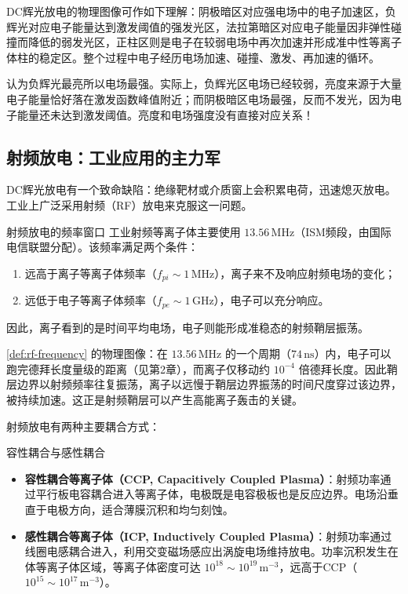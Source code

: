 \documentclass[12pt,a4paper,openany,oneside]{book}
\begin{document}
\begin{insight}{}{}
DC辉光放电的物理图像可作如下理解：阴极暗区对应强电场中的电子加速区，负辉光对应电子能量达到激发阈值的强发光区，法拉第暗区对应电子能量因非弹性碰撞而降低的弱发光区，正柱区则是电子在较弱电场中再次加速并形成准中性等离子体柱的稳定区。整个过程中电子经历电场加速、碰撞、激发、再加速的循环。
\end{insight}

\begin{warning}{}{}
认为负辉光最亮所以电场最强。实际上，负辉光区电场已经较弱，亮度来源于大量电子能量恰好落在激发函数峰值附近；而阴极暗区电场最强，反而不发光，因为电子能量还未达到激发阈值。亮度和电场强度没有直接对应关系！
\end{warning}

\subsection{射频放电：工业应用的主力军}

DC辉光放电有一个致命缺陷：绝缘靶材或介质窗上会积累电荷，迅速熄灭放电。工业上广泛采用射频（RF）放电来克服这一问题。

\begin{definition}{射频放电的频率窗口}{}{}
\label{def:rf-frequency}
工业射频等离子体主要使用 $13.56\,\mathrm{MHz}$（ISM频段，由国际电信联盟分配）。该频率满足两个条件：
\begin{enumerate}
\item 远高于离子等离子体频率（$f_{pi} \sim 1\,\mathrm{MHz}$），离子来不及响应射频电场的变化；
\item 远低于电子等离子体频率（$f_{pe} \sim 1\,\mathrm{GHz}$），电子可以充分响应。
\end{enumerate}
因此，离子看到的是时间平均电场，电子则能形成准稳态的射频鞘层振荡。
\end{definition}

\begin{insight}{}{}
\cref{def:rf-frequency} 的物理图像：在 $13.56\,\mathrm{MHz}$ 的一个周期（$74\,\mathrm{ns}$）内，电子可以跑完德拜长度量级的距离（见第2章），而离子仅移动约 $10^{-4}$ 倍德拜长度。因此鞘层边界以射频频率往复振荡，离子以远慢于鞘层边界振荡的时间尺度穿过该边界，被持续加速。这正是射频鞘层可以产生高能离子轰击的关键。
\end{insight}

射频放电有两种主要耦合方式：

\begin{definition}{容性耦合与感性耦合}{}{}
\label{def:ccp-icp}
\begin{itemize}
\item \textbf{容性耦合等离子体（CCP, Capacitively Coupled Plasma）}：射频功率通过平行板电容耦合进入等离子体，电极既是电容极板也是反应边界。电场沿垂直于电极方向，适合薄膜沉积和均匀刻蚀。
\item \textbf{感性耦合等离子体（ICP, Inductively Coupled Plasma）}：射频功率通过线圈电感耦合进入，利用交变磁场感应出涡旋电场维持放电。功率沉积发生在体等离子体区域，等离子体密度可达 $10^{18}\sim 10^{19}\,\mathrm{m^{-3}}$，远高于CCP（$10^{15}\sim 10^{17}\,\mathrm{m^{-3}}$）。
\end{itemize}
\end{definition}
\end{document}
